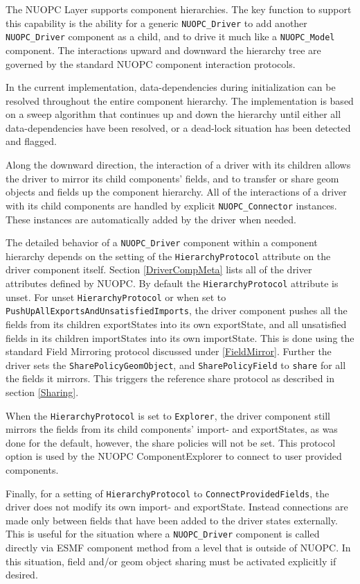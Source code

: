 %

\label{ComponentHierarchy}

The NUOPC Layer supports component hierarchies. The key function to support this capability is the ability for a generic {\tt NUOPC\_Driver} to add another {\tt NUOPC\_Driver} component as a child, and to drive it much like a {\tt NUOPC\_Model} component. The interactions upward and downward the hierarchy tree are governed by the standard NUOPC component interaction protocols.

In the current implementation, data-dependencies during initialization can be resolved throughout the entire component hierarchy. The implementation is based on a sweep algorithm that continues up and down the hierarchy until either all data-dependencies have been resolved, or a dead-lock situation has been detected and flagged.

Along the downward direction, the interaction of a driver with its children allows the driver to mirror its child components' fields, and to transfer or share geom objects and fields up the component hierarchy. All of the interactions of a driver with its child components are handled by explicit {\tt NUOPC\_Connector} instances. These instances are automatically added by the driver when needed.

The detailed behavior of a {\tt NUOPC\_Driver} component within a component hierarchy depends on the setting of the {\tt HierarchyProtocol} attribute on the driver component itself. Section \ref{DriverCompMeta} lists all of the driver attributes defined by NUOPC. By default the {\tt HierarchyProtocol} attribute is unset. For unset {\tt HierarchyProtocol} or when set to {\tt PushUpAllExportsAndUnsatisfiedImports}, the driver component pushes all the fields from its children exportStates into its own exportState, and all unsatisfied fields in its children importStates into its own importState. This is done using the standard Field Mirroring protocol discussed under \ref{FieldMirror}. Further the driver sets the {\tt SharePolicyGeomObject}, and 
{\tt SharePolicyField} to {\tt share} for all the fields it mirrors. This triggers the reference share protocol as described in section \ref{Sharing}.

When the {\tt HierarchyProtocol} is set to {\tt Explorer}, the driver component still mirrors the fields from its child components' import- and exportStates, as was done for the default, however, the share policies will not be set. This protocol option is used by the NUOPC ComponentExplorer to connect to user provided components.

Finally, for a setting of {\tt HierarchyProtocol} to {\tt ConnectProvidedFields}, the driver does not modify its own import- and exportState. Instead connections are made only between fields that have been added to the driver states externally. This is useful for the situation where a {\tt NUOPC\_Driver} component is called directly via ESMF component method from a level that is outside of NUOPC. In this situation, field and/or geom object sharing must be activated explicitly if desired.

